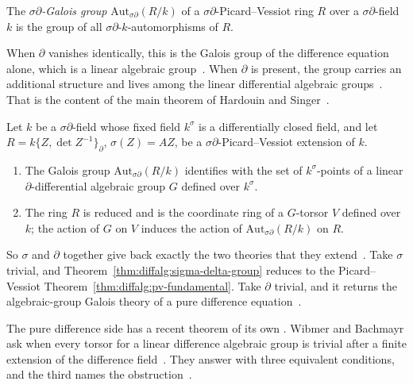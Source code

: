 \begin{definition}\label{def:diffalg:sigma-delta-galois-group}
The \emph{$\sigma\partial$-Galois group} $\mathrm{Aut}_{\sigma\partial}(R/k)$
of a $\sigma\partial$-Picard--Vessiot ring $R$ over a
$\sigma\partial$-field $k$ is the group of all
$\sigma\partial$-$k$-automorphisms of $R$.
\end{definition}

When $\partial$ vanishes identically, this is the Galois group of the
difference equation alone, which is a linear algebraic
group~\cite[pp.~5--6]{HardouinSinger2008}. When $\partial$ is present, the
group carries an additional structure and lives among the linear differential
algebraic groups~\cite[Theorem~2.6, p.~6]{HardouinSinger2008}. That is the
content of the main theorem of Hardouin and
Singer~\cite[Theorem~2.6, p.~6]{HardouinSinger2008}.

\begin{theorem}\label{thm:diffalg:sigma-delta-group}
Let $k$ be a $\sigma\partial$-field whose fixed field $k^\sigma$ is a
differentially closed field, and let $R = k\{Z, \det Z^{-1}\}_\partial$,
$\sigma(Z) = AZ$, be a $\sigma\partial$-Picard--Vessiot extension of $k$.
\begin{enumerate}
\item The Galois group $\mathrm{Aut}_{\sigma\partial}(R/k)$ identifies
  with the set of $k^\sigma$-points of a linear
  $\partial$-differential algebraic group $G$ defined over $k^\sigma$.
\item The ring $R$ is reduced and is the coordinate ring of a $G$-torsor
  $V$ defined over $k$; the action of $G$ on $V$ induces the action of
  $\mathrm{Aut}_{\sigma\partial}(R/k)$ on $R$.
\end{enumerate}
\end{theorem}

So $\sigma$ and $\partial$ together give back exactly the two theories that
they extend~\cite[pp.~5--6]{HardouinSinger2008}. Take $\sigma$ trivial, and
Theorem~\ref{thm:diffalg:sigma-delta-group} reduces to the Picard--Vessiot
Theorem~\ref{thm:diffalg:pv-fundamental}. Take $\partial$ trivial, and it
returns the algebraic-group Galois theory of a pure difference
equation~\cite[pp.~5--6]{HardouinSinger2008}.

The pure difference side has a recent theorem of its own
\cite[Theorem~1.2, p.~2]{WibmerBachmayr2025}. Wibmer and Bachmayr ask when
every torsor for a linear difference algebraic group is trivial after a finite
extension of the difference field~\cite[Theorem~1.2, p.~2]{WibmerBachmayr2025}.
They answer with three equivalent conditions, and the third names the
obstruction~\cite[Theorem~1.2, p.~2]{WibmerBachmayr2025}.

